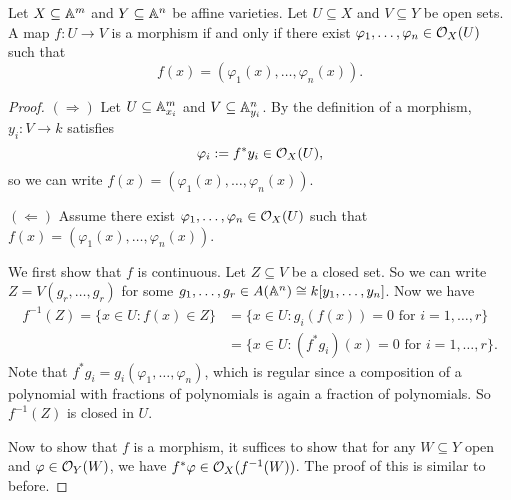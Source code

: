 \begin{prop}
  Let $X \subseteq \mathbb{A}^m$ and
  $Y \subseteq \mathbb{A}^n$ be affine
  varieties. Let $U \subseteq X$ and
  $V \subseteq Y$ be open sets. A map
  $f : U \to V$ is a morphism if and only
  if there exist
  $\varphi_1, \dots, \varphi_n \in \mathcal{O}_X(U)$
  such that
  \[f(x) = (\varphi_1(x), \dots, \varphi_n(x)).\]
\end{prop}

\begin{proof}
  $(\Rightarrow)$ Let $U \subseteq \mathbb{A}^m_{x_i}$
  and $V \subseteq \mathbb{A}^n_{y_i}$.
  By the definition of a morphism,
  $y_i : V \to k$ satisfies
  \[
    \varphi_i := f^* y_i \in \mathcal{O}_X(U),
  \]
  so we can write
  $f(x) = (\varphi_1(x), \dots, \varphi_n(x))$.

  $(\Leftarrow)$
  Assume there exist $\varphi_1, \dots, \varphi_n \in \mathcal{O}_X(U)$
  such that
  $f(x) = (\varphi_1(x), \dots, \varphi_n(x))$.

  We first show that $f$ is continuous.
  Let $Z \subseteq V$ be a closed set.
  So we can write
  $Z = V(g_r, \dots, g_r)$ for some
  $g_1, \dots, g_r \in A(\mathbb{A}^n) \cong k[y_1, \dots, y_n]$.
  Now we have
  \begin{align*}
    f^{-1}(Z)
    = \{x \in U : f(x) \in Z\}
    &= \{
      x \in U : g_i(f(x)) = 0 \text{ for } i = 1, \dots, r
    \} \\
    &= \{
      x \in U : (f^* g_i)(x) = 0 \text{ for } i = 1, \dots, r
    \}.
  \end{align*}
  Note that $f^* g_i = g_i(\varphi_1, \dots, \varphi_n)$, which
  is regular since a composition of
  a polynomial with fractions of
  polynomials is again a fraction of
  polynomials. So
  $f^{-1}(Z)$ is closed in $U$.

  Now to show that $f$ is a morphism,
  it suffices to show that for
  any $W \subseteq Y$ open and
  $\varphi \in \mathcal{O}_Y(W)$, we have
  $f^* \varphi \in \mathcal{O}_X(f^{-1}(W))$.
  The proof of this is similar to before.
\end{proof}

